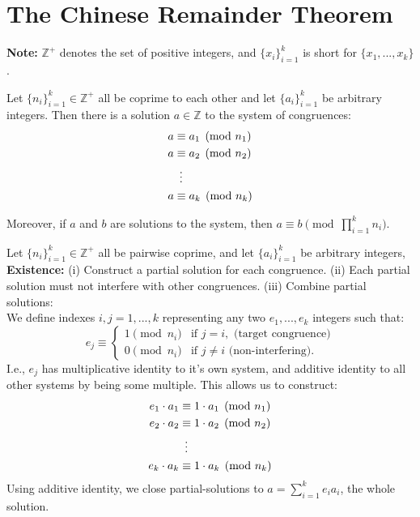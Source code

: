

\section{The Chinese Remainder Theorem}

\begin{Note}
    \textbf{Note:} $\mathbb{Z}^+$ denotes the set of positive integers, and $\{x_i\}_{i=1}^k$ is short for $\{x_1,...,x_k\}$.
\end{Note}
\begin{theo}

    Let $\{n_i\}_{i=1}^k\in\mathbb{Z}^+$ all be coprime to each other and let $\{a_i\}_{i=1}^k$ be arbitrary integers. Then there is a solution $a\in\mathbb{Z}$ to the system of congruences:
    \begin{align*}
        a &\equiv a_1 \pmod{n_1} \\
        a &\equiv a_2 \pmod{n_2} \\
        &\hspace*{.5em}\vdots \\
        a &\equiv a_k \pmod{n_k}
    \end{align*}
    
    
    \noindent
    Moreover, if $a$ and $b$ are solutions to the system, then $a\equiv b\pmod{\prod_{i=1}^k n_i}$.
\end{theo}
\begin{Proof}
Let $\{n_i\}_{i=1}^k\in\mathbb{Z}^+$ all be pairwise coprime, and let $\{a_i\}_{i=1}^k$ be arbitrary integers,\\

\noindent
\textbf{Existence:} (i) Construct a partial solution for each congruence. (ii) Each
partial solution must not interfere with other congruences. (iii) Combine partial solutions:\\

\noindent
We define indexes $i,j=1,...,k$ representing any two $e_1,...,e_k$ integers such that:
 \[e_j \equiv
 \begin{cases} 
 1 \pmod{n_i} & \text{if } j = i, \text{ (target congruence)}\\
 0 \pmod{n_i} & \text{if } j \neq i \text{ (non-interfering)}.
 \end{cases}
 \]
 I.e., $e_j$ has multiplicative identity to it's own system, and additive identity to all other systems
 by being some multiple. This allows us to construct:
 \begin{align*}
    e_1\cdot a_1 &\equiv 1\cdot a_1 \pmod{n_1} \\
    e_2\cdot a_2 &\equiv 1\cdot a_2 \pmod{n_2} \\
    &\hspace*{.5em}\vdots \\
    e_k\cdot a_k &\equiv 1\cdot a_k \pmod{n_k}
\end{align*}
Using additive identity, we close partial-solutions to $a = \sum_{i=1}^k e_ia_i$, the whole solution.
\end{Proof}

